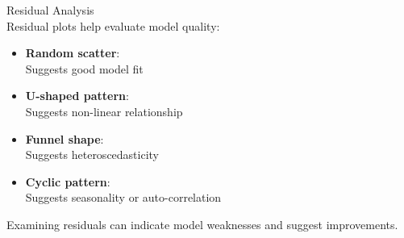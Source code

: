 \begin{corollary}{Residual Analysis}\\
Residual plots help evaluate model quality:
\begin{itemize}
    \item \textbf{Random scatter}: \\Suggests good model fit
    \item \textbf{U-shaped pattern}: \\ Suggests non-linear relationship
    \item \textbf{Funnel shape}: \\ Suggests heteroscedasticity
    \item \textbf{Cyclic pattern}: \\ Suggests seasonality or auto-correlation
\end{itemize}
\vspace{1mm}
Examining residuals can indicate model weaknesses and suggest improvements.
\end{corollary}

